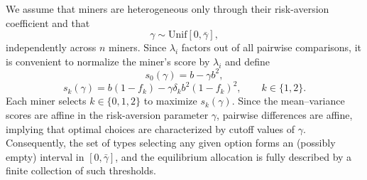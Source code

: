 We assume that miners are heterogeneous only through their risk-aversion coefficient and that
\begin{equation}
\gamma \sim \mathrm{Unif}[0,\bar{\gamma}],
\end{equation}
independently across $n$ miners. Since $\lambda_i$ factors out of all pairwise comparisons, it is convenient to normalize the miner's score by $\lambda_i$ and define
\begin{equation}
s_0(\gamma)=b-\gamma b^2,
\end{equation}
\begin{equation}
s_k(\gamma)=b(1-f_k)-\gamma \delta_k b^2(1-f_k)^2,
\qquad k\in\{1,2\}.
\end{equation}
Each miner selects $k \in \{0,1,2\}$ to maximize $s_k(\gamma)$. Since the mean--variance scores are affine in the risk-aversion parameter $\gamma$, pairwise differences are affine, implying that optimal choices are characterized by cutoff values of $\gamma$. Consequently, the set of types selecting any given option forms an (possibly empty) interval in $[0,\bar{\gamma}]$, and the equilibrium allocation is fully described by a finite collection of such thresholds.

